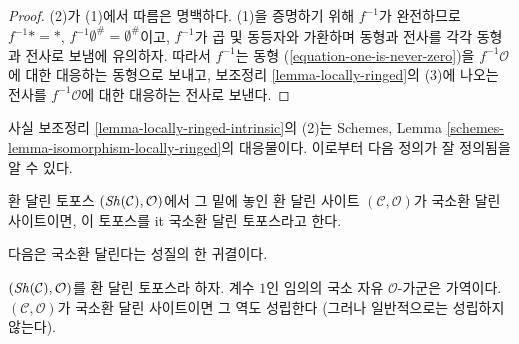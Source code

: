 \begin{proof}
(2)가 (1)에서 따름은 명백하다. (1)을 증명하기 위해 $f^{-1}$가 완전하므로
$f^{-1}* = *$, $f^{-1}\emptyset^\# = \emptyset^\#$이고, $f^{-1}$가 곱 및
동등자와 가환하며 동형과 전사를 각각 동형과 전사로 보냄에 유의하자.
따라서 $f^{-1}$는 동형 (\ref{equation-one-is-never-zero})을
$f^{-1}\mathcal{O}$에 대한 대응하는 동형으로 보내고, 보조정리
\ref{lemma-locally-ringed}의 (3)에 나오는 전사를
$f^{-1}\mathcal{O}$에 대한 대응하는 전사로 보낸다.
\end{proof}

\noindent
사실 보조정리 \ref{lemma-locally-ringed-intrinsic}의 (2)는
Schemes, Lemma \ref{schemes-lemma-isomorphism-locally-ringed}의
대응물이다. 이로부터 다음 정의가 잘 정의됨을 알 수 있다.

\begin{definition}
\label{definition-locally-ringed-topos}
환 달린 토포스 $(\mathop{\mathit{Sh}}\nolimits(\mathcal{C}), \mathcal{O})$에서 그 밑에 놓인
환 달린 사이트 $(\mathcal{C}, \mathcal{O})$가 국소환 달린 사이트이면,
이 토포스를 {it 국소환 달린 토포스}라고 한다.
\end{definition}

\noindent
다음은 국소환 달린다는 성질의 한 귀결이다.

\begin{lemma}
\label{lemma-invertible-is-locally-free-rank-1}
$(\mathop{\mathit{Sh}}\nolimits(\mathcal{C}), \mathcal{O})$를 환 달린 토포스라 하자. 계수 $1$인
임의의 국소 자유 $\mathcal{O}$-가군은 가역이다.
$(\mathcal{C}, \mathcal{O})$가 국소환 달린 사이트이면 그 역도 성립한다
(그러나 일반적으로는 성립하지 않는다).
\end{lemma}

